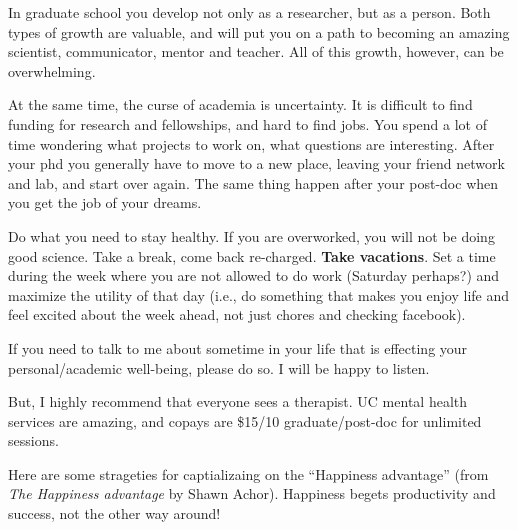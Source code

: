 \documentclass[12pt]{article}
\begin{document}
In graduate school you develop not only as a researcher, but as a
person. Both types of growth are valuable, and will put you on a path
to becoming an amazing scientist, communicator, mentor and
teacher. All of this growth, however, can be overwhelming.

At the same time, the curse of academia is uncertainty. It is
difficult to find funding for research and fellowships, and hard to
find jobs. You spend a lot of time wondering what projects to work on,
what questions are interesting. After your phd you generally have to
move to a new place, leaving your friend network and lab, and start
over again. The same thing happen after your post-doc when you get the
job of your dreams.

Do what you need to stay healthy. If you are overworked, you will not
be doing good science. Take a break, come back re-charged. \textbf{Take
vacations}. Set a time during the week where you are not allowed to do
work (Saturday perhaps?) and maximize the utility of that day (i.e.,
do something that makes you enjoy life and feel excited about the week
ahead, not just chores and checking facebook).

If you need to talk to me about sometime in your life that is effecting
your personal/academic well-being, please do so. I will be happy to
listen. 

But, I highly recommend that everyone sees a therapist. UC mental
health services are amazing, and copays are \$15/10 graduate/post-doc
for unlimited sessions.

Here are some strageties for captializaing on the ``Happiness
advantage'' (from \textit{The Happiness advantage} by Shawn
Achor). Happiness begets productivity and success, not the other way
around!
\end{document}

